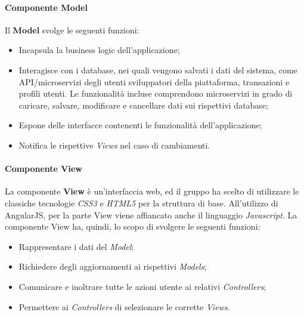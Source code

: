 \paragraph{Componente Model}
Il \textbf{Model} svolge le seguenti funzioni:
\begin{itemize}
	\item Incapsula la business logic dell'applicazione;
	
	\item Interagisce con i database, nei quali vengono salvati i dati del sistema, come API/microservizi degli utenti sviluppatori della piattaforma, transazioni e profili utenti. Le funzionalità incluse comprendono microservizi in grado di caricare, salvare, modificare e cancellare dati sui rispettivi database;
	
	\item Espone delle interfacce contenenti le funzionalità dell'applicazione;
	
	\item Notifica le rispettive \textit{Views} nel caso di cambiamenti.
\end{itemize}

\paragraph{Componente View}
La componente \textbf{View} è un'interfaccia web, ed il gruppo ha scelto di utilizzare le classiche tecnologie \textit{CSS3} e \textit{HTML5} per la struttura di base. All'utilizzo di AngularJS, per la parte View viene affiancato anche il linguaggio \textit{Javascript}. La componente View ha, quindi, lo scopo di svolgere le seguenti funzioni:

\begin{itemize}
	\item Rappresentare i dati del \textit{Model};
	
	\item Richiedere degli aggiornamenti ai rispettivi \textit{Models};
	
	\item Comunicare e inoltrare tutte le azioni utente ai relativi \textit{Controllers};
	
	\item Permettere ai \textit{Controllers} di selezionare le corrette \textit{Views}.
\end{itemize} 

